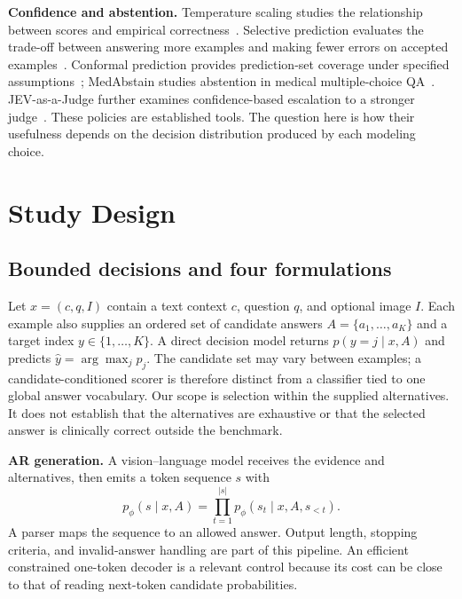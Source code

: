 \textbf{Confidence and abstention.} Temperature scaling studies the relationship between scores and empirical correctness~\cite{guo}. Selective prediction evaluates the trade-off between answering more examples and making fewer errors on accepted examples~\cite{selective,reliablevqa}. Conformal prediction provides prediction-set coverage under specified assumptions~\cite{conformal}; MedAbstain studies abstention in medical multiple-choice QA~\cite{medabstain}. JEV-as-a-Judge further examines confidence-based escalation to a stronger judge~\cite{jevjudge}. These policies are established tools. The question here is how their usefulness depends on the decision distribution produced by each modeling choice.

\section{Study Design}
\label{sec:design}

\subsection{Bounded decisions and four formulations}

Let $x=(c,q,I)$ contain a text context $c$, question $q$, and optional image $I$. Each example also supplies an ordered set of candidate answers $A=\{a_1,\ldots,a_K\}$ and a target index $y\in\{1,\ldots,K\}$. A direct decision model returns $p(y=j\mid x,A)$ and predicts $\hat y=\arg\max_j p_j$. The candidate set may vary between examples; a candidate-conditioned scorer is therefore distinct from a classifier tied to one global answer vocabulary. Our scope is selection within the supplied alternatives. It does not establish that the alternatives are exhaustive or that the selected answer is clinically correct outside the benchmark.

\textbf{AR generation.} A vision--language model receives the evidence and alternatives, then emits a token sequence $s$ with
\begin{equation}
 p_{\phi}(s\mid x,A)=\prod_{t=1}^{|s|}p_{\phi}(s_t\mid x,A,s_{<t}).
\end{equation}
A parser maps the sequence to an allowed answer. Output length, stopping criteria, and invalid-answer handling are part of this pipeline. An efficient constrained one-token decoder is a relevant control because its cost can be close to that of reading next-token candidate probabilities.

